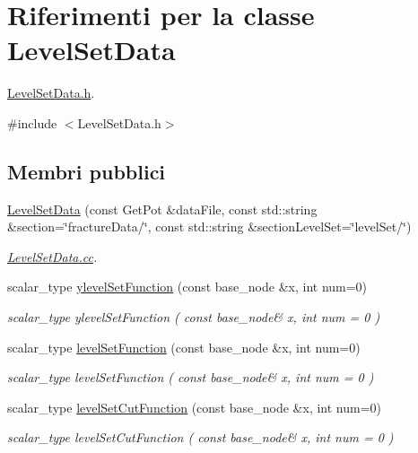 \hypertarget{classLevelSetData}{\section{Riferimenti per la classe Level\-Set\-Data}
\label{classLevelSetData}
}


\hyperlink{LevelSetData_8h}{Level\-Set\-Data.\-h}.  




{\ttfamily \#include $<$Level\-Set\-Data.\-h$>$}

\subsection*{Membri pubblici}
\begin{DoxyCompactItemize}
\item 
\hyperlink{classLevelSetData_a8b2ab7808f47d9a951327891d65e84be}{Level\-Set\-Data} (const Get\-Pot \&data\-File, const std\-::string \&section=\char`\"{}fracture\-Data/\char`\"{}, const std\-::string \&section\-Level\-Set=\char`\"{}level\-Set/\char`\"{})
\begin{DoxyCompactList}\small\item\em \hyperlink{LevelSetData_8cc}{Level\-Set\-Data.\-cc}. \end{DoxyCompactList}\item 
scalar\-\_\-type \hyperlink{classLevelSetData_ab6dee766ab332d7384cc0db802001365}{ylevel\-Set\-Function} (const base\-\_\-node \&x, int num=0)
\begin{DoxyCompactList}\small\item\em scalar\-\_\-type ylevel\-Set\-Function ( const base\-\_\-node\& x, int num = 0 ) \end{DoxyCompactList}\item 
scalar\-\_\-type \hyperlink{classLevelSetData_a15b4379080b2320c54467c89c3642c4a}{level\-Set\-Function} (const base\-\_\-node \&x, int num=0)
\begin{DoxyCompactList}\small\item\em scalar\-\_\-type level\-Set\-Function ( const base\-\_\-node\& x, int num = 0 ) \end{DoxyCompactList}\item 
scalar\-\_\-type \hyperlink{classLevelSetData_a080eb321db2710b115ea6ea4344551e8}{level\-Set\-Cut\-Function} (const base\-\_\-node \&x, int num=0)
\begin{DoxyCompactList}\small\item\em scalar\-\_\-type level\-Set\-Cut\-Function ( const base\-\_\-node\& x, int num = 0 ) \end{DoxyCompactList}\item 

\end{DoxyCompactItemize}
